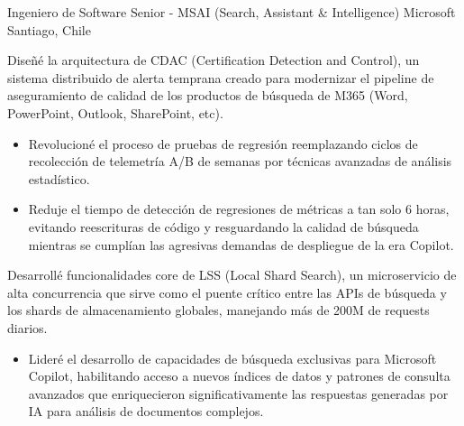 

\begin{cventries}
  \cventry
    {Ingeniero de Software Senior - MSAI (Search, Assistant \& Intelligence)} %
    {Microsoft} %
    {Santiago, Chile} %
    {} %
    {
        \begin{cvitems}
            \item {
                Diseñé la arquitectura de CDAC (Certification Detection and Control), un sistema distribuido de alerta temprana creado para modernizar el pipeline de aseguramiento de calidad de los productos de búsqueda de M365 (Word, PowerPoint, Outlook, SharePoint, etc).
                  \begin{itemize}
                    \item {Revolucioné el proceso de pruebas de regresión reemplazando ciclos de recolección de telemetría A/B de semanas por técnicas avanzadas de análisis estadístico.}
                    \item {Reduje el tiempo de detección de regresiones de métricas a tan solo 6 horas, evitando reescrituras de código y resguardando la calidad de búsqueda mientras se cumplían las agresivas demandas de despliegue de la era Copilot.}
                  \end{itemize}
            }
            \item {
              Desarrollé funcionalidades core de LSS (Local Shard Search), un microservicio de alta concurrencia que sirve como el puente crítico entre las APIs de búsqueda y los shards de almacenamiento globales, manejando más de 200M de requests diarios.
              \begin{itemize}
                \item {Lideré el desarrollo de capacidades de búsqueda exclusivas para Microsoft Copilot, habilitando acceso a nuevos índices de datos y patrones de consulta avanzados que enriquecieron significativamente las respuestas generadas por IA para análisis de documentos complejos.}

\end{itemize}}
\end{cvitems}}
\end{cventries}
